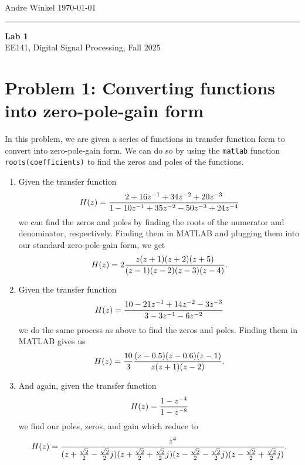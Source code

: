 \documentclass[11pt]{article}
\begin{document}
\noindent Andre Winkel \hfill \today \\
\rule{\textwidth}{0.4pt}

\begin{center} \large {\textbf{Lab 1}} \\[0em] {EE141, Digital Signal Processing, Fall 2025} \end{center}

\section{Problem 1: Converting functions into zero-pole-gain form}
In this problem, we are given a series of functions in transfer function form 
to convert into zero-pole-gain form. We can do so by using the \texttt{matlab} function 
\texttt{roots(coefficients)} to find the zeros and poles of the functions.
\begin{enumerate}[label=\textbf{\alph*)}, leftmargin=2.6em]
    \item Given the transfer function
    \begin{equation} \notag
        H(z) = \frac{2+16z^{-1}+34z^{-2}+20z^{-3}}{1-10z^{-1}+35z^{-2}-50z^{-3}+24z^{-4}}
    \end{equation}
    we can find the zeros and poles by finding the roots of the numerator and denominator, respectively.
    Finding them in MATLAB and plugging them into our standard zero-pole-gain form, we get
    \begin{equation} \notag
        H(z) = 2\frac{z(z+1)(z+2)(z+5)}{(z-1)(z-2)(z-3)(z-4)}.
    \end{equation}

    \item Given the transfer function
    \begin{equation} \notag
        H(z) = \frac{10-21z^{-1}+14z^{-2}-3z^{-3}}{3-3z^{-1}-6z^{-2}}
    \end{equation}
    we do the same process as above to find the zeros and poles. Finding them in MATLAB gives us 
    \begin{equation} \notag
        H(z) = \frac{10}{3}\frac{(z-0.5)(z-0.6)(z-1)}{z(z+1)(z-2)}.
    \end{equation}

    \item And again, given the transfer function
    \begin{equation} \notag
        H(z) = \frac{1-z^{-4}}{1-z^{-8}}
    \end{equation}
    we find our poles, zeros, and gain which reduce to
    \begin{equation} \notag
        H(z) = \frac{z^{4}}
        {(z+\frac{\sqrt2}{2}-\frac{\sqrt2}{2}j)(z+\frac{\sqrt2}{2}+\frac{\sqrt2}{2}j)(z-\frac{\sqrt2}{2}-\frac{\sqrt2}{2}j)(z-\frac{\sqrt2}{2}+\frac{\sqrt2}{2}j)}.
    \end{equation}
\end{enumerate}
\end{document}
